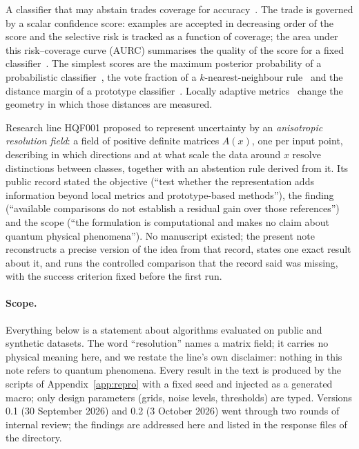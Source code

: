 \documentclass[10pt,a4paper]{article}
\theoremstyle{plain}
\theoremstyle{definition}
\theoremstyle{remark}
\begin{document}
A classifier that may abstain trades coverage for accuracy~\citep{chow1970,elyaniv2010,franc2023}. The trade is governed by a scalar confidence score: examples are accepted in decreasing order of the score and the selective risk is tracked as a function of coverage; the area under this risk--coverage curve (AURC) summarises the quality of the score for a fixed classifier~\citep{geifman2017,geifman2019}. The simplest scores are the maximum posterior probability of a probabilistic classifier~\citep{hendrycks2017}, the vote fraction of a $k$-nearest-neighbour rule~\citep{cover1967} and the distance margin of a prototype classifier~\citep{kohonen1995,tibshirani2002}. Locally adaptive metrics~\citep{hastie1996,weinberger2009} change the geometry in which those distances are measured.

Research line HQF001 proposed to represent uncertainty by an \emph{anisotropic resolution field}: a field of positive definite matrices $A(x)$, one per input point, describing in which directions and at what scale the data around $x$ resolve distinctions between classes, together with an abstention rule derived from it. Its public record stated the objective (``test whether the representation adds information beyond local metrics and prototype-based methods''), the finding (``available comparisons do not establish a residual gain over those references'') and the scope (``the formulation is computational and makes no claim about quantum physical phenomena''). No manuscript existed; the present note reconstructs a precise version of the idea from that record, states one exact result about it, and runs the controlled comparison that the record said was missing, with the success criterion fixed before the first run.

\paragraph{Scope.} Everything below is a statement about algorithms evaluated on public and synthetic datasets. The word ``resolution'' names a matrix field; it carries no physical meaning here, and we restate the line's own disclaimer: nothing in this note refers to quantum phenomena. Every result in the text is produced by the scripts of Appendix~\ref{app:repro} with a fixed seed and injected as a generated macro; only design parameters (grids, noise levels, thresholds) are typed. Versions 0.1 (30 September 2026) and 0.2 (3 October 2026) went through two rounds of internal review; the findings are addressed here and listed in the response files of the directory.
\end{document}
